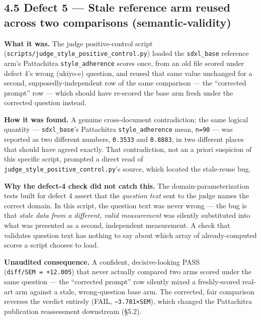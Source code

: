 \hypertarget{defect-5-stale-reference-arm-reused-across-two-comparisons-semantic-validity}{%
\subsection{4.5 Defect 5 --- Stale reference arm reused across two
comparisons
(semantic-validity)}\label{defect-5-stale-reference-arm-reused-across-two-comparisons-semantic-validity}}

\textbf{What it was.} The judge positive-control script
(\texttt{scripts/judge\_style\_positive\_control.py}) loaded the
\texttt{sdxl\_base} reference arm's Pattachitra
\texttt{style\_adherence} scores once, from an old file scored under
defect 4's wrong (ukiyo-e) question, and reused that same value
unchanged for a second, supposedly-independent row of the same
comparison --- the ``corrected prompt'' row --- which should have
re-scored the base arm fresh under the corrected question instead.

\textbf{How it was found.} A genuine cross-document contradiction: the
same logical quantity --- \texttt{sdxl\_base}'s Pattachitra
\texttt{style\_adherence} mean, \texttt{n=90} --- was reported as two
different numbers, \texttt{0.3533} and \texttt{0.8883}, in two different
places that should have agreed exactly. That contradiction, not an a
priori suspicion of this specific script, prompted a direct read of
\texttt{judge\_style\_positive\_control.py}'s source, which located the
stale-reuse bug.

\textbf{Why the defect-4 check did not catch this.} The
domain-parameterization tests built for defect 4 assert that the
\emph{question text} sent to the judge names the correct domain. In this
script, the question text was never wrong --- the bug is that
\emph{stale data from a different, valid measurement} was silently
substituted into what was presented as a second, independent
measurement. A check that validates question text has nothing to say
about which array of already-computed scores a script chooses to load.

\textbf{Unaudited consequence.} A confident, decisive-looking PASS
(\texttt{diff/SEM\ =\ +12.005}) that never actually compared two arms
scored under the same question --- the ``corrected prompt'' row silently
mixed a freshly-scored real-art arm against a stale, wrong-question base
arm. The corrected, fair comparison reverses the verdict entirely (FAIL,
\texttt{−3.781×SEM}), which changed the Pattachitra publication
reassessment downstream (§5.2).

